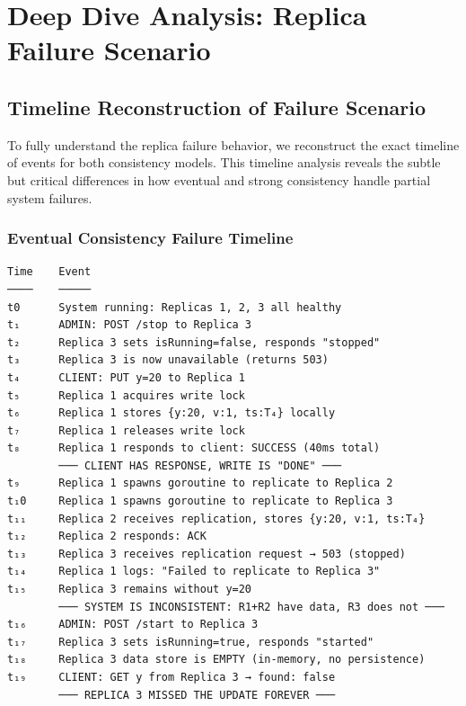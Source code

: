 \documentclass[10pt,a4paper]{article}
\begin{document}
\newpage

\section{Deep Dive Analysis: Replica Failure Scenario}

\subsection{Timeline Reconstruction of Failure Scenario}

To fully understand the replica failure behavior, we reconstruct the exact timeline of events for both consistency models. This timeline analysis reveals the subtle but critical differences in how eventual and strong consistency handle partial system failures.

\subsubsection{Eventual Consistency Failure Timeline}

\begin{verbatim}
Time    Event
────    ─────
t0      System running: Replicas 1, 2, 3 all healthy
t₁      ADMIN: POST /stop to Replica 3
t₂      Replica 3 sets isRunning=false, responds "stopped"
t₃      Replica 3 is now unavailable (returns 503)
t₄      CLIENT: PUT y=20 to Replica 1
t₅      Replica 1 acquires write lock
t₆      Replica 1 stores {y:20, v:1, ts:T₄} locally
t₇      Replica 1 releases write lock
t₈      Replica 1 responds to client: SUCCESS (40ms total)
        ─── CLIENT HAS RESPONSE, WRITE IS "DONE" ───
t₉      Replica 1 spawns goroutine to replicate to Replica 2
t₁0     Replica 1 spawns goroutine to replicate to Replica 3
t₁₁     Replica 2 receives replication, stores {y:20, v:1, ts:T₄}
t₁₂     Replica 2 responds: ACK
t₁₃     Replica 3 receives replication request → 503 (stopped)
t₁₄     Replica 1 logs: "Failed to replicate to Replica 3"
t₁₅     Replica 3 remains without y=20
        ─── SYSTEM IS INCONSISTENT: R1+R2 have data, R3 does not ───
t₁₆     ADMIN: POST /start to Replica 3
t₁₇     Replica 3 sets isRunning=true, responds "started"
t₁₈     Replica 3 data store is EMPTY (in-memory, no persistence)
t₁₉     CLIENT: GET y from Replica 3 → found: false
        ─── REPLICA 3 MISSED THE UPDATE FOREVER ───
\end{verbatim}
\end{document}
